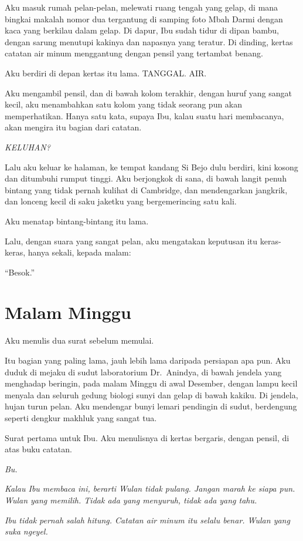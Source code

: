\documentclass[11pt,twoside,openany]{book}
\begin{document}
Aku masuk rumah pelan-pelan, melewati ruang tengah yang gelap, di mana bingkai makalah nomor dua tergantung di samping foto Mbah Darmi dengan kaca yang berkilau dalam gelap. Di dapur, Ibu sudah tidur di dipan bambu, dengan sarung menutupi kakinya dan napasnya yang teratur. Di dinding, kertas catatan air minum menggantung dengan pensil yang tertambat benang.

Aku berdiri di depan kertas itu lama. TANGGAL. AIR.

Aku mengambil pensil, dan di bawah kolom terakhir, dengan huruf yang sangat kecil, aku menambahkan satu kolom yang tidak seorang pun akan memperhatikan. Hanya satu kata, supaya Ibu, kalau suatu hari membacanya, akan mengira itu bagian dari catatan.

\emph{KELUHAN?}

Lalu aku keluar ke halaman, ke tempat kandang Si Bejo dulu berdiri, kini kosong dan ditumbuhi rumput tinggi. Aku berjongkok di sana, di bawah langit penuh bintang yang tidak pernah kulihat di Cambridge, dan mendengarkan jangkrik, dan lonceng kecil di saku jaketku yang bergemerincing satu kali.

Aku menatap bintang-bintang itu lama.

Lalu, dengan suara yang sangat pelan, aku mengatakan keputusan itu keras-keras, hanya sekali, kepada malam:

``Besok.''

\chapter{Malam Minggu}
Aku menulis dua surat sebelum memulai.

Itu bagian yang paling lama, jauh lebih lama daripada persiapan apa pun. Aku duduk di mejaku di sudut laboratorium Dr.~Anindya, di bawah jendela yang menghadap beringin, pada malam Minggu di awal Desember, dengan lampu kecil menyala dan seluruh gedung biologi sunyi dan gelap di bawah kakiku. Di jendela, hujan turun pelan. Aku mendengar bunyi lemari pendingin di sudut, berdengung seperti dengkur makhluk yang sangat tua.

Surat pertama untuk Ibu. Aku menulisnya di kertas bergaris, dengan pensil, di atas buku catatan.

\emph{Bu.}

\emph{Kalau Ibu membaca ini, berarti Wulan tidak pulang. Jangan marah ke siapa pun. Wulan yang memilih. Tidak ada yang menyuruh, tidak ada yang tahu.}

\emph{Ibu tidak pernah salah hitung. Catatan air minum itu selalu benar. Wulan yang suka ngeyel.}
\end{document}
